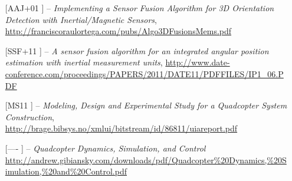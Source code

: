 \documentclass[12pt, a4paper, lithuanian, final]{article}
\begin{document}

\begin{itemize}%
	\item [[AAJ+01]] -- \textit{Implementing a Sensor Fusion Algorithm for 3D Orientation Detection with Inertial/Magnetic Sensors}, \url{http://franciscoraulortega.com/pubs/Algo3DFusionsMems.pdf}
	\item [[SSF+11]] -- \textit{A sensor fusion algorithm for an integrated angular position estimation with inertial measurement units}, \url{http://www.date-conference.com/proceedings/PAPERS/2011/DATE11/PDFFILES/IP1_06.PDF}
	\item [[MS11]] -- \textit{Modeling, Design and Experimental Study for a Quadcopter System Construction}, \url{http://brage.bibsys.no/xmlui/bitstream/id/86811/uiareport.pdf}
	\item [[----]] -- \textit{Quadcopter Dynamics, Simulation, and Control} \url{http://andrew.gibiansky.com/downloads/pdf/Quadcopter\%20Dynamics,\%20Simulation,\%20and\%20Control.pdf}
\end{itemize}
\end{document}
